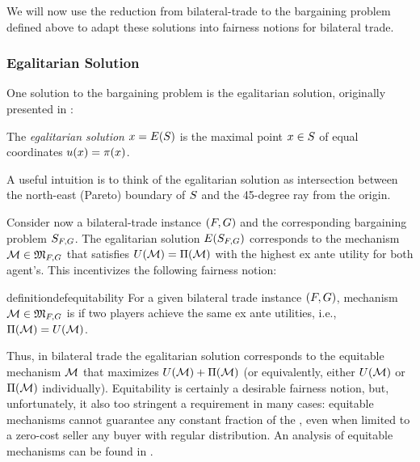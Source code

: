 {We will now use the reduction from bilateral-trade to the bargaining problem defined above to adapt these solutions into fairness notions for bilateral trade.

\subsubsection{Egalitarian Solution}
One solution to the bargaining problem is the egalitarian solution, originally presented in \citet{Kal-77,Mye-77}:

\begin{definition}
    The \emph{egalitarian solution} $x=E(S)$ is the maximal point $x\in S$ of equal coordinates $u(x)=\pi(x)$. 
\end{definition}

A useful intuition is to think of the egalitarian solution as intersection between the {north-east} (Pareto) boundary of $S$ and the 45-degree ray from the origin.

Consider now a bilateral-trade instance $(F,G)$ and the corresponding bargaining problem $S_{F,G}$. The egalitarian solution $E(S_{F,G})$ corresponds to the mechanism $\mathcal{M}\in \mathfrak{M}_{F,G}$ that satisfies $U(\mathcal{M}) = \Pi(\mathcal{M})$ {with the highest ex ante utility for both agent's}. This incentivizes the following fairness notion:

\begin{restatable}[Equitability]{definition}{defequitability}
\label{def:equitable}
    {For a given bilateral trade instance $(F,G)$, mechanism $\mathcal{M}\in \mathfrak{M}_{F,G}$} is \emph{\equitable} if two players achieve the same ex ante utilities, i.e., $\Pi(\mathcal{M}) = U(\mathcal{M})$.
\end{restatable}

Thus, in bilateral trade the egalitarian solution corresponds to the equitable mechanism $\mathcal{M}$ {that maximizes $U(\mathcal{M}) + \Pi(\mathcal{M})$} (or equivalently, either $U(\mathcal{M})$ or $\Pi(\mathcal{M})$ individually). Equitability is certainly a desirable fairness notion, but, unfortunately, it also too stringent a requirement in many cases: equitable mechanisms cannot guarantee any constant fraction of the {\SecondBest}, even when limited to a zero-cost seller any buyer with regular distribution. An analysis of equitable mechanisms can be found in .

}
